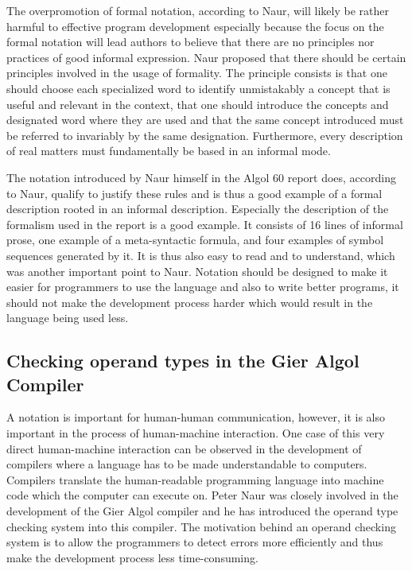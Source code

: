 \documentclass{article}
\begin{document}
The overpromotion of formal notation, according to Naur, will likely be rather harmful to effective program development especially because the focus on the formal notation will lead authors to believe that there are no principles nor practices of good informal expression. Naur proposed that there should be certain principles involved in the usage of formality. The principle consists is that one should choose each specialized word to identify unmistakably a concept that is useful and relevant in the context, that one should introduce the concepts and designated word where they are used and that the same concept introduced must be referred to invariably by the same designation. Furthermore, every description of real matters must fundamentally be based in an informal mode.

The notation introduced by Naur himself in the Algol 60 report does, according to Naur, qualify to justify these rules and is thus a good example of a formal description rooted in an informal description. Especially the description of the formalism used in the report is a good example. It consists of 16 lines of informal prose, one example of a meta-syntactic formula, and four examples of symbol sequences generated by it. It is thus also easy to read and to understand, which was another important point to Naur. Notation should be designed to make it easier for programmers to use the language and also to write better programs, it should not make the development process harder which would result in the language being used less.

\subsection{Checking operand types in the Gier Algol Compiler}
A notation is important for human-human communication, however, it is also important in the process of human-machine interaction. One case of this very direct human-machine interaction can be observed in the development of compilers where a language has to be made understandable to computers. Compilers translate the human-readable programming language into machine code which the computer can execute on. Peter Naur was closely involved in the development of the Gier Algol compiler and he has introduced the operand type checking system into this compiler. The motivation behind an operand checking system is to allow the programmers to detect errors more efficiently and thus make the development process less time-consuming. 
\end{document}
